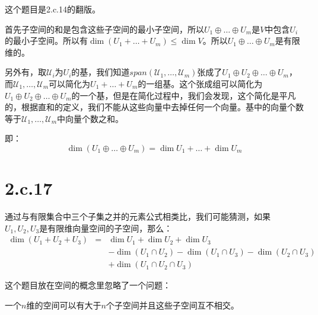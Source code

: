 \documentclass[10pt,a4paper,UTF8]{article}
\begin{document}
\begin{answer}
这个题目是2.c.14的翻版。

首先子空间的和是包含这些子空间的最小子空间，所以\(U_{1}\oplus \ldots \oplus U_{m}\)是\(V\)中包含\(U_{i}\)的最小子空间。所以有\(\dim(U_{1} + \ldots + U_{m}) \leq \dim V\)。所以\(U_{1}\oplus \ldots \oplus U_{m}\)是有限维的。

另外有，取\(\mathcal{U}_{i}\)为\(U_{i}\)的基，我们知道\(span( \mathcal{U}_{1},\ldots , \mathcal{U}_{m})\)张成了\(U_{1}\oplus U_{2}\oplus \ldots \oplus U_{m}\)，而\(\mathcal{U}_{1},\ldots , \mathcal{U}_{m}\)可以简化为\(U_{1}+\ldots +U_{m}\)的一组基。这个张成组可以简化为\(U_{1}\oplus U_{2}\oplus \ldots \oplus U_{m}\)的一个基，但是在简化过程中，我们会发现，这个简化是平凡的，根据直和的定义，我们不能从这些向量中去掉任何一个向量。基中的向量个数等于\(\mathcal{U}_{1},\ldots , \mathcal{U}_{m}\)中向量个数之和。

即：
\begin{equation}
\label{eq:20}
\dim(U_{1} \oplus \ldots \oplus U_{m}) = \dim U_{1} + \ldots + \dim U_{m}
\end{equation}
\end{answer}
\section{2.c.17}
\label{sec:org4c266fe}


\begin{problem}
通过与有限集合中三个子集之并的元素公式相类比，我们可能猜测，如果\(U_{1},U_{2},U_{3}\)是有限维向量空间的子空间，那么：
\begin{eqnarray}
\label{eq:19}
\dim (U_{1} + U_{2} + U_{3})&=& \dim U_{1} + \dim U_{2} + \dim U_{3} \\
&& - \dim(U_{1}\cap U_{2}) - \dim(U_{1}\cap U_{3}) - \dim(U_{2}\cap U_{3}) \\
&& + \dim(U_{1}\cap U_{2} \cap U_{3})
\end{eqnarray}
\end{problem}


\begin{answer}
这个题目放在空间的概念里忽略了一个问题：

一个\(n\)维的空间可以有大于\(n\)个子空间并且这些子空间互不相交。
\end{answer}
\end{document}
